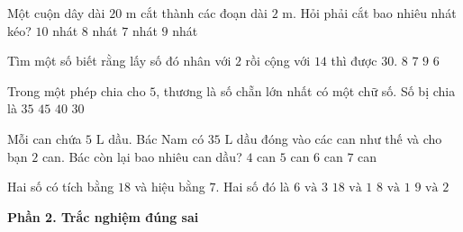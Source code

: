 \begin{ex} %
Một cuộn dây dài $20\text{ m}$ cắt thành các đoạn dài $2\text{ m}$. Hỏi phải cắt bao nhiêu nhát kéo?
\choice
{$10$ nhát}
{$8$ nhát}
{$7$ nhát}
{\True $9$ nhát}
\end{ex}

\begin{ex} %
Tìm một số biết rằng lấy số đó nhân với $2$ rồi cộng với $14$ thì được $30$.
\choice
{\True $8$}
{$7$}
{$9$}
{$6$}
\end{ex}

\begin{ex} %
Trong một phép chia cho $5$, thương là số chẵn lớn nhất có một chữ số. Số bị chia là
\choice
{$35$}
{$45$}
{\True $40$}
{$30$}
\end{ex}

\begin{ex} %
Mỗi can chứa $5\text{ L}$ dầu. Bác Nam có $35\text{ L}$ dầu đóng vào các can như thế và cho bạn $2$ can. Bác còn lại bao nhiêu can dầu?
\choice
{$4$ can}
{\True $5$ can}
{$6$ can}
{$7$ can}
\end{ex}

\begin{ex} %
Hai số có tích bằng $18$ và hiệu bằng $7$. Hai số đó là
\choice
{$6\text{ và } 3$}
{$18\text{ và } 1$}
{$8\text{ và } 1$}
{\True $9\text{ và } 2$}
\end{ex}

\textbf{Phần 2. Trắc nghiệm đúng sai}

